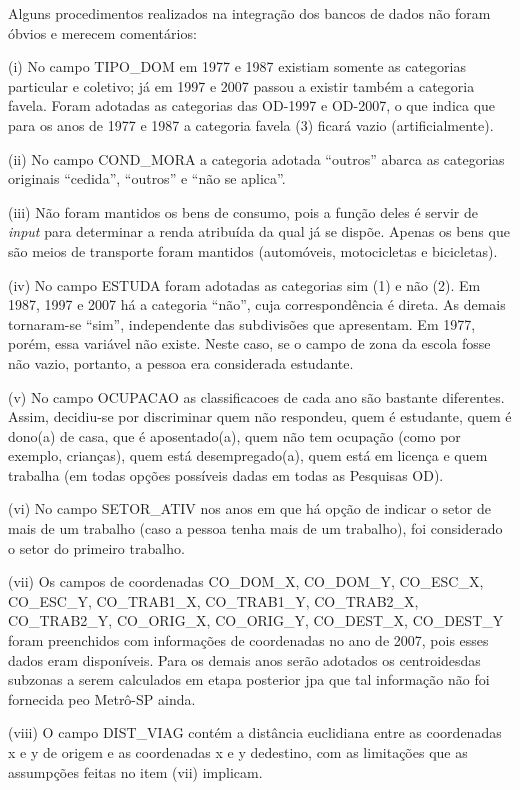 Alguns procedimentos realizados na integração dos bancos de dados não foram óbvios e merecem comentários:
\begin{compactitem}[]
\item(i) No campo TIPO_DOM em 1977 e 1987 existiam somente as categorias particular e coletivo; já em 1997 e 2007 passou a existir também a categoria favela. Foram adotadas as categorias das OD-1997 e OD-2007, o que indica que para os anos de 1977 e 1987 a categoria favela (3) ficará vazio (artificialmente).
\item(ii) No campo COND_MORA a categoria adotada ``outros'' abarca as categorias originais ``cedida'', ``outros'' e ``não se aplica''.
\item(iii) Não foram mantidos os bens de consumo, pois a função deles é servir de \emph{input} para determinar a renda atribuída da qual já se dispõe. Apenas os bens que são meios de transporte foram mantidos (automóveis, motocicletas e bicicletas).
\item (iv) No campo ESTUDA foram adotadas as categorias sim (1) e não (2). Em 1987, 1997 e 2007 há a categoria ``não'', cuja correspondência é direta. As demais tornaram-se ``sim'', independente das subdivisões que apresentam. Em 1977, porém, essa variável não existe. Neste caso, se o campo de zona da escola fosse não vazio, portanto, a pessoa era considerada estudante.
\item (v) No campo OCUPACAO as classificacoes de cada ano são bastante diferentes. Assim, decidiu-se por discriminar quem não respondeu, quem é estudante, quem é dono(a) de casa, que é aposentado(a), quem não tem ocupação (como por exemplo, crianças), quem está desempregado(a), quem está em licença e quem trabalha (em todas opções possíveis dadas em todas as Pesquisas OD).
\item(vi) No campo SETOR_ATIV nos anos em que há opção de indicar o setor de mais de um trabalho (caso a pessoa tenha mais de um trabalho), foi considerado o setor do primeiro trabalho.
\item(vii) Os campos de coordenadas CO_DOM_X, CO_DOM_Y, CO_ESC_X, CO_ESC_Y, CO_TRAB1_X, CO_TRAB1_Y, CO_TRAB2_X, CO_TRAB2_Y, CO_ORIG_X, CO_ORIG_Y, CO_DEST_X, CO_DEST_Y foram preenchidos com informações de coordenadas no ano de 2007, pois esses dados eram disponíveis. Para os demais anos serão adotados os centroidesdas subzonas a serem calculados em etapa posterior jpa que tal informação não foi fornecida peo Metrô-SP ainda.
\item(viii) O campo DIST_VIAG contém a distância euclidiana entre as coordenadas x e y de origem e as coordenadas x e y dedestino, com as limitações que as assumpções feitas no item (vii) implicam.

\end{compactitem}
